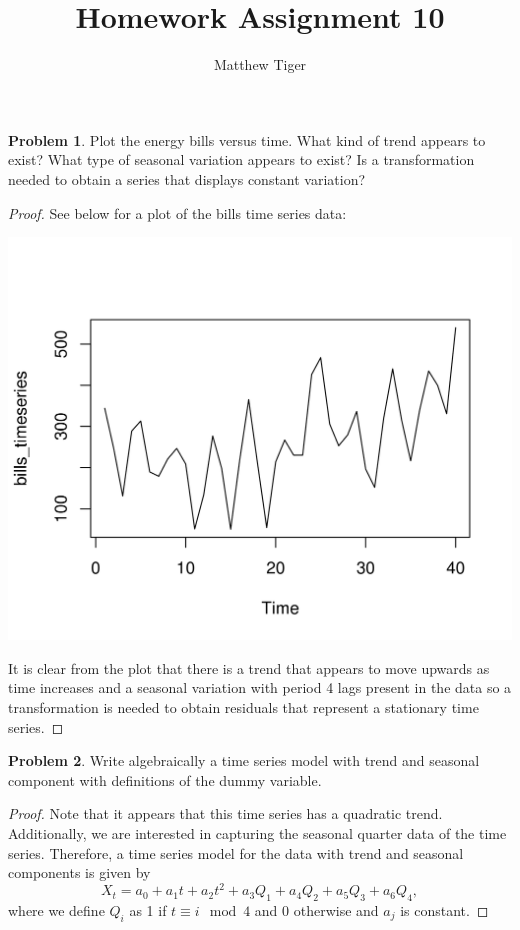 \documentclass[12pt]{article}
\title{Homework Assignment 10}
\author{Matthew Tiger}
\theoremstyle{definition}
\newtheorem{problem}{Problem}
\begin{document}
\maketitle


\begin{problem}
  Plot the energy bills versus time. What kind of trend appears to exist? What type of seasonal
  variation appears to exist? Is a transformation needed to obtain a series that displays constant
  variation?
\end{problem}

\begin{proof}
  See below for a plot of the bills time series data:
  \vskip 0mm
  \begin{center}
  \includegraphics{timeseries}
  \end{center}
  \vskip 10mm

  It is clear from the plot that there is a trend that appears to move upwards
  as time increases and a seasonal variation with period 4
  lags present in the data so a transformation is needed to obtain residuals
  that represent a stationary time series.
\end{proof}


\begin{problem}
  Write algebraically a time series model with trend and seasonal component with definitions
  of the dummy variable.
\end{problem}

\begin{proof}
  Note that it appears that this time series has a quadratic trend. Additionally,
  we are interested in capturing the seasonal quarter data of the time series.
  Therefore, a time series model for the data with trend and seasonal components is given by
  \[
    X_t = a_0 + a_1 t + a_2 t^2 + a_3 Q_1 + a_4 Q_2 + a_5 Q_3 + a_6 Q_4,
  \]
  where we define $Q_i$ as 1 if $t \equiv i \mod 4$ and 0 otherwise and $a_j$ is
  constant.
\end{proof}
\end{document}
